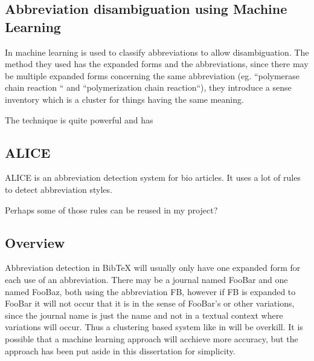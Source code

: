 \subsection{Abbreviation disambiguation using Machine Learning}
In \cite{okazaki2010_building} machine learning is used to classify
abbreviations to allow disambiguation.  The method they used has the
expanded forms and the abbreviations, since there may be multiple
expanded forms concerning the same abbreviation (eg. ``polymerase
chain reaction `` and ``polymerization chain reaction``), they
introduce a sense inventory which is a cluster for things having the
same meaning.

The technique is quite powerful and has

\subsection{ALICE}
ALICE is an abbreviation detection system for bio articles. It uses a
lot of rules to detect abbreviation styles.

Perhaps some of those rules can be reused in my project?

\subsection{Overview}

Abbreviation detection in Bib{\TeX} will usually only have one
expanded form for each use of an abbreviation.  There may be a journal
named FooBar and one named FooBaz, both using the abbreviation FB,
however if FB is expanded to FooBar it will not occur that it is in
the sense of FooBar's or other variations, since the journal name is
just the name and not in a textual context where variations will
occur.  Thus a clustering based system like in
\cite{okazaki2010_building} will be overkill.  It is possible that a
machine learning approach will acchieve more accuracy, but the
approach has been put aside in this dissertation for simplicity.


